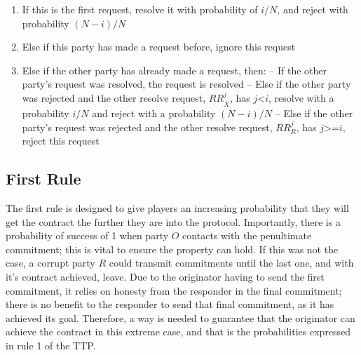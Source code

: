 \documentclass{l4proj}
\begin{document}
\begin{enumerate}
\item If this is the first request, resolve it with probability of $i/N$, and reject with probability $(N-i)/N$
\item Else if this party has made a request before, ignore this request
\item Else if the other party has already made a request, then:
\subitem-- If the other party's request was resolved, the request is resolved
\subitem-- Else if the other party was rejected and the other resolve request, $RR{_{\bar{X}}^{j}}$, has $j$<$i$, resolve with a probability $i/N$ and reject with a probability $(N-i)/N$
\subitem-- Else if the other party's request was rejected and the other resolve request, $RR{_{R}^{j}}$, has $j$>=$i$, reject this request
\end{enumerate}

\subsection{First Rule}
The first rule is designed to give players an increasing probability that they will get the contract the further they are into the protocol. Importantly, there is a probability of success of 1 when party $O$ contacts with the penultimate commitment; this is vital to ensure the property can hold. If this was not the case, a corrupt party $R$ could transmit commitments until the last one, and with it's contract achieved, leave. Due to the originator having to send the first commitment, it relies on honesty from the responder in the final commitment; there is no benefit to the responder to send that final commitment, as it has achieved its goal. Therefore, a way is needed to guarantee that the originator can achieve the contract in this extreme case, and that is the probabilities expressed in rule 1 of the TTP.
\end{document}
